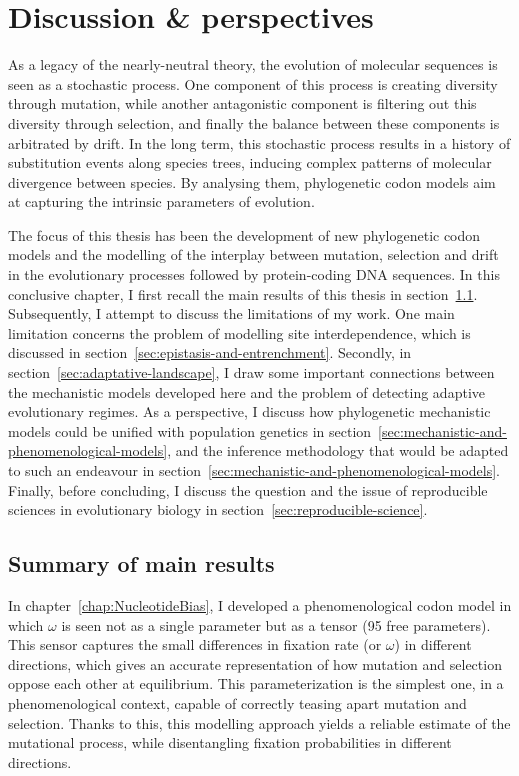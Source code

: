 \chapter{Discussion \& perspectives}
\label{ch:discussion-perspectives}
{\hypersetup{linkcolor=GREYDARK}\minitoc}

As a legacy of the nearly-neutral theory, the evolution of molecular sequences is seen as a stochastic process.
One component of this process is creating diversity through mutation, while another antagonistic component is filtering out this diversity through selection, and finally the balance between these components is arbitrated by drift.
In the long term, this stochastic process results in a history of substitution events along species trees, inducing complex patterns of molecular divergence between species.
By analysing them, phylogenetic codon models aim at capturing the intrinsic parameters of evolution.

The focus of this thesis has been the development of new phylogenetic codon models and the modelling of the interplay between mutation, selection and drift in the evolutionary processes followed by protein-coding DNA sequences.
In this conclusive chapter, I first recall the main results of this thesis in section~\ref{sec:summary-of-main-results}.
Subsequently, I attempt to discuss the limitations of my work.
One main limitation concerns the problem of modelling site interdependence, which is discussed in section~\ref{sec:epistasis-and-entrenchment}.
Secondly, in section~\ref{sec:adaptative-landscape}, I draw some important connections between the mechanistic models developed here and the problem of detecting adaptive evolutionary regimes.
As a perspective, I discuss how phylogenetic mechanistic models could be unified with population genetics in section~\ref{sec:mechanistic-and-phenomenological-models}, and the inference methodology that would be adapted to such an endeavour in section~\ref{sec:mechanistic-and-phenomenological-models}.
Finally, before concluding, I discuss the question and the issue of reproducible sciences in evolutionary biology in section~\ref{sec:reproducible-science}.


\section{Summary of main results}
\label{sec:summary-of-main-results}

In chapter~\ref{chap:NucleotideBias}, I developed a phenomenological codon model in which $\omega$ is seen not as a single parameter but as a tensor (95 free parameters).
This sensor captures the small differences in fixation rate (or $\omega$) in different directions, which gives an accurate representation of how mutation and selection oppose each other at equilibrium.
This parameterization is the simplest one, in a phenomenological context, capable of correctly teasing apart mutation and selection.
Thanks to this, this modelling approach yields a reliable estimate of the mutational process, while disentangling fixation probabilities in different directions.

